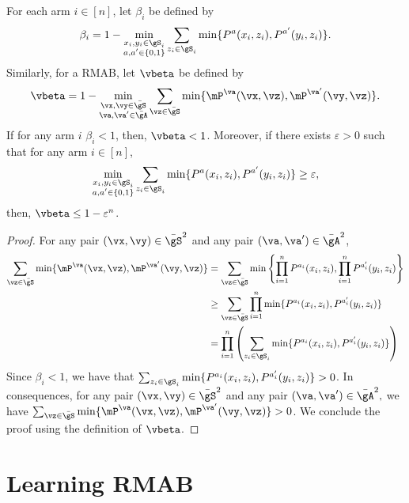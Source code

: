 \begin{thm}
    \label{thm:ergodicity_coeff} For each arm $i\in[n]$, let $\beta_i$ be defined by
    \begin{align*}
        \beta_i = 1-\min_{\substack{x_i,y_i\in\gS_i \\a,a'\in\{0,1\}}} \sum_{z_i\in\gS_i} \min\{P^{a}(x_i,z_i), P^{a'}(y_i,z_i)\}.
    \end{align*}
    Similarly, for a RMAB, let $\vbeta$ be defined by
    \begin{align*}
        \vbeta = 1-\min_{\substack{\vx,\vy\in\bar{\gS} \\\va,\va'\in\bar{\gA}}} \sum_{\vz\in\bar{\gS}} \min\{\mP^{\va}(\vx,\vz), \mP^{\va'}(\vy,\vz)\}.
    \end{align*}
    If for any arm $i$ $\beta_i<1$, then, $\vbeta<1$.
    Moreover, if there exists $\varepsilon>0$ such that for any arm $i\in[n]$,
    \begin{align*}
        \min_{\substack{x_i,y_i\in\gS_i \\a,a'\in\{0,1\}}} \sum_{z_i\in\gS_i} \min\{P^{a}(x_i,z_i), P^{a'}(y_i,z_i)\} \ge \varepsilon,
    \end{align*}
    then, $\vbeta\le 1-\varepsilon^n$.
\end{thm}
\begin{proof}
    For any pair $(\vx,\vy)\in\bar{\gS}^2$ and any pair $(\va,\va')\in\bar{\gA}^2$,
    \begin{align*}
        \sum_{\vz\in\bar{\gS}} \min\{\mP^{\va}(\vx,\vz), \mP^{\va'}(\vy,\vz)\}
        &= \sum_{\vz\in\bar{\gS}} \min\left\{\prod_{i=1}^nP^{a_i}(x_i,z_i), \prod_{i=1}^nP^{a_i'}(y_i,z_i)\right\} \\
        &\ge \sum_{\vz\in\bar{\gS}}\prod_{i=1}^n \min\{P^{a_i}(x_i,z_i), P^{a_i'}(y_i,z_i)\} \\
        &= \prod_{i=1}^n \left(\sum_{z_i\in\gS_i} \min\{P^{a_i}(x_i,z_i), P^{a_i'}(y_i,z_i)\}\right)
    \end{align*}
    Since $\beta_i<1$, we have that $\sum_{z_i\in\gS_i} \min\{P^{a_i}(x_i,z_i), P^{a_i'}(y_i,z_i)\}>0$.
    In consequences, for any pair $(\vx,\vy)\in\bar{\gS}^2$ and any pair $(\va,\va')\in\bar{\gA}^2,$ we have ${\sum_{\vz\in\bar{\gS}} \min\{\mP^{\va}(\vx,\vz), \mP^{\va'}(\vy,\vz)\}>0}$.
    We conclude the proof using the definition of $\vbeta$.
\end{proof}


\section{Learning RMAB}

